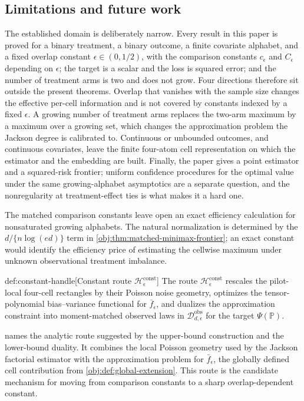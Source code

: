 \documentclass[11pt]{article}
\begin{document}
\subsection{Limitations and future work}

The established domain is deliberately narrow. Every result in this paper is proved for a binary treatment, a binary outcome, a finite covariate alphabet, and a fixed overlap constant \(\epsilon\in(0,1/2)\), with the comparison constants \(c_\epsilon\) and \(C_\epsilon\) depending on \(\epsilon\); the target is a scalar and the loss is squared error; and the number of treatment arms is two and does not grow. Four directions therefore sit outside the present theorems. Overlap that vanishes with the sample size changes the effective per-cell information and is not covered by constants indexed by a fixed \(\epsilon\). A growing number of treatment arms replaces the two-arm maximum by a maximum over a growing set, which changes the approximation problem the Jackson degree is calibrated to. Continuous or unbounded outcomes, and continuous covariates, leave the finite four-atom cell representation on which the estimator and the embedding are built. Finally, the paper gives a point estimator and a squared-risk frontier; uniform confidence procedures for the optimal value under the same growing-alphabet asymptotics are a separate question, and the nonregularity at treatment-effect ties is what makes it a hard one.


The matched comparison constants leave open an exact efficiency calculation for nonsaturated growing alphabets. The natural normalization is determined by the \(d/\{n\log(ed)\}\) term in \cref{obj:thm:matched-minimax-frontier}; an exact constant would identify the efficiency price of estimating the cellwise maximum under unknown observational treatment imbalance.

\begin{definitionv}{def:constant-handle}[Constant route \(\mathscr H_\epsilon^{\mathrm{const}}\)]
The route \(\mathscr H_\epsilon^{\mathrm{const}}\) rescales the pilot-local four-cell rectangles by their Poisson noise geometry, optimizes the tensor-polynomial bias--variance functional for \(\bar f_\epsilon\), and dualizes the approximation constraint into moment-matched observed laws in \(\mathcal D_{d,\epsilon}^{\mathrm{obs}}\) for the target \(\Psi(\mathbb P)\).
\end{definitionv}

 names the analytic route suggested by the upper-bound construction and the lower-bound duality. It combines the local Poisson geometry used by the Jackson factorial estimator with the approximation problem for \(\bar f_\epsilon\), the globally defined cell contribution from \cref{obj:def:global-extension}. This route is the candidate mechanism for moving from comparison constants to a sharp overlap-dependent constant.
\end{document}
